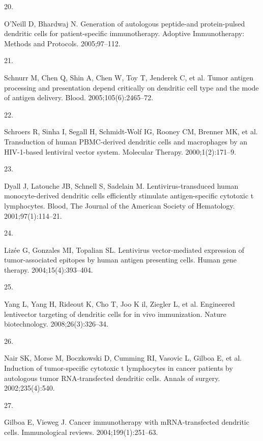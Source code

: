 \documentclass[
]{article}
\newlength{\cslhangindent}
\newlength{\csllabelwidth}
\newenvironment{CSLReferences}[2] %
 {\begin{list}{}{%
  \setlength{\itemindent}{0pt}
  \setlength{\leftmargin}{0pt}
  \setlength{\parsep}{0pt}
  \ifodd #1
   \setlength{\leftmargin}{\cslhangindent}
   \setlength{\itemindent}{-1\cslhangindent}
  \fi
  \setlength{\itemsep}{#2\baselineskip}}}
 {\end{list}}
\newcommand{\CSLLeftMargin}[1]{\parbox[t]{\csllabelwidth}{\strut#1\strut}}
\newcommand{\CSLRightInline}[1]{\parbox[t]{\linewidth - \csllabelwidth}{\strut#1\strut}}
\begin{document}
\begin{CSLReferences}{0}{1}
\CSLLeftMargin{20. }%
\CSLRightInline{O'Neill D, Bhardwaj N. Generation of autologous
peptide-and protein-pulsed dendritic cells for patient-specific
immunotherapy. Adoptive Immunotherapy: Methods and Protocols.
2005;97--112. }

\CSLLeftMargin{21. }%
\CSLRightInline{Schnurr M, Chen Q, Shin A, Chen W, Toy T, Jenderek C, et
al. Tumor antigen processing and presentation depend critically on
dendritic cell type and the mode of antigen delivery. Blood.
2005;105(6):2465--72. }

\CSLLeftMargin{22. }%
\CSLRightInline{Schroers R, Sinha I, Segall H, Schmidt-Wolf IG, Rooney
CM, Brenner MK, et al. Transduction of human PBMC-derived dendritic
cells and macrophages by an HIV-1-based lentiviral vector system.
Molecular Therapy. 2000;1(2):171--9. }

\CSLLeftMargin{23. }%
\CSLRightInline{Dyall J, Latouche JB, Schnell S, Sadelain M.
Lentivirus-transduced human monocyte-derived dendritic cells efficiently
stimulate antigen-specific cytotoxic t lymphocytes. Blood, The Journal
of the American Society of Hematology. 2001;97(1):114--21. }

\CSLLeftMargin{24. }%
\CSLRightInline{Lizée G, Gonzales MI, Topalian SL. Lentivirus
vector-mediated expression of tumor-associated epitopes by human antigen
presenting cells. Human gene therapy. 2004;15(4):393--404. }

\CSLLeftMargin{25. }%
\CSLRightInline{Yang L, Yang H, Rideout K, Cho T, Joo K il, Ziegler L,
et al. Engineered lentivector targeting of dendritic cells for in vivo
immunization. Nature biotechnology. 2008;26(3):326--34. }

\CSLLeftMargin{26. }%
\CSLRightInline{Nair SK, Morse M, Boczkowski D, Cumming RI, Vasovic L,
Gilboa E, et al. Induction of tumor-specific cytotoxic t lymphocytes in
cancer patients by autologous tumor RNA-transfected dendritic cells.
Annals of surgery. 2002;235(4):540. }

\CSLLeftMargin{27. }%
\CSLRightInline{Gilboa E, Vieweg J. Cancer immunotherapy with
mRNA-transfected dendritic cells. Immunological reviews.
2004;199(1):251--63. }


\end{CSLReferences}
\end{document}
